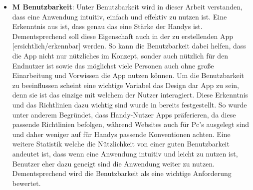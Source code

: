 \begin{itemize}
	\item \textbf{M Benutzbarkeit}: %
		Unter Benutzbarkeit wird in dieser Arbeit verstanden, dass eine Anwendung intuitiv, einfach und effektiv zu nutzen ist.\newline%
		Eine Erkenntnis aus  ist, dass genau das eine Stärke der Handys ist. Dementsprechend soll diese Eigenschaft auch in der zu erstellenden App [ersichtlich/erkennbar] werden.\newline%
			So kann die Benutzbarkeit dabei helfen, dass die App nicht nur nützliches im Konzept, sonder auch nützlich für den Endnutzer ist sowie das möglichst viele Personen auch ohne große Einarbeitung und Vorwissen die App nutzen können.
		Um die Benutzbarkeit zu beeinflussen scheint eine wichtige Variabel das Design dar App zu sein, denn sie ist das einzige mit welchem der Nutzer interagiert. 
			Diese Erkenntnis und das Richtlinien dazu wichtig sind wurde in  bereits festgestellt. So wurde unter anderem Begründet, dass Handy-Nutzer Apps präferieren\cite{pcVsphone_mobileAppVsWebTimeSpent}, da diese passende Richtlinien befolgen, während Websites auch für Pc's ausgelegt sind und daher weniger auf für Handys passende Konventionen achten. 
			Eine weitere Statistik welche die Nützlichkeit von einer guten Benutzbarkeit andeutet ist, dass wenn eine Anwendung intuitiv und leicht zu nutzen ist, Benutzer eher dazu geneigt sind die Anwendung weiter zu nutzen\cite{pcVsphone_peopleWillRevisitMobileIfEasyToUse}.\newline%
	Dementsprechend wird die Benutzbarkeit als eine wichtige Anforderung bewertet.%
		

\end{itemize}
